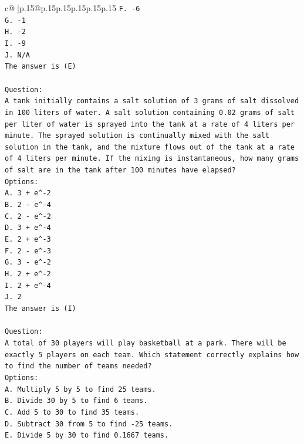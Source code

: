 \documentclass{article}
\begin{document}
{\begin{supertabular}{c@{$\;$}|p{.15\linewidth}@{}p{.15\linewidth}p{.15\linewidth}p{.15\linewidth}p{.15\linewidth}p{.15\linewidth}}
{{{\texttt{F. {-}6} \\
\texttt{G. {-}1} \\
\texttt{H. {-}2} \\
\texttt{I. {-}9} \\
\texttt{J. N/A} \\
\texttt{The answer is (E)} \\
\\ 
\texttt{Question:} \\
\texttt{A tank initially contains a salt solution of 3 grams of salt dissolved in 100 liters of water. A salt solution containing 0.02 grams of salt per liter of water is sprayed into the tank at a rate of 4 liters per minute. The sprayed solution is continually mixed with the salt solution in the tank, and the mixture flows out of the tank at a rate of 4 liters per minute. If the mixing is instantaneous, how many grams of salt are in the tank after 100 minutes have elapsed?} \\
\texttt{Options:} \\
\texttt{A. 3 + e\^{}{-}2} \\
\texttt{B. 2 {-} e\^{}{-}4} \\
\texttt{C. 2 {-} e\^{}{-}2} \\
\texttt{D. 3 + e\^{}{-}4} \\
\texttt{E. 2 + e\^{}{-}3} \\
\texttt{F. 2 {-} e\^{}{-}3} \\
\texttt{G. 3 {-} e\^{}{-}2} \\
\texttt{H. 2 + e\^{}{-}2} \\
\texttt{I. 2 + e\^{}{-}4} \\
\texttt{J. 2} \\
\texttt{The answer is (I)} \\
\\ 
\texttt{Question:} \\
\texttt{A total of 30 players will play basketball at a park. There will be exactly 5 players on each team. Which statement correctly explains how to find the number of teams needed?} \\
\texttt{Options:} \\
\texttt{A. Multiply 5 by 5 to find 25 teams.} \\
\texttt{B. Divide 30 by 5 to find 6 teams.} \\
\texttt{C. Add 5 to 30 to find 35 teams.} \\
\texttt{D. Subtract 30 from 5 to find {-}25 teams.} \\
\texttt{E. Divide 5 by 30 to find 0.1667 teams.} \\
}}}
\end{supertabular}}
\end{document}
